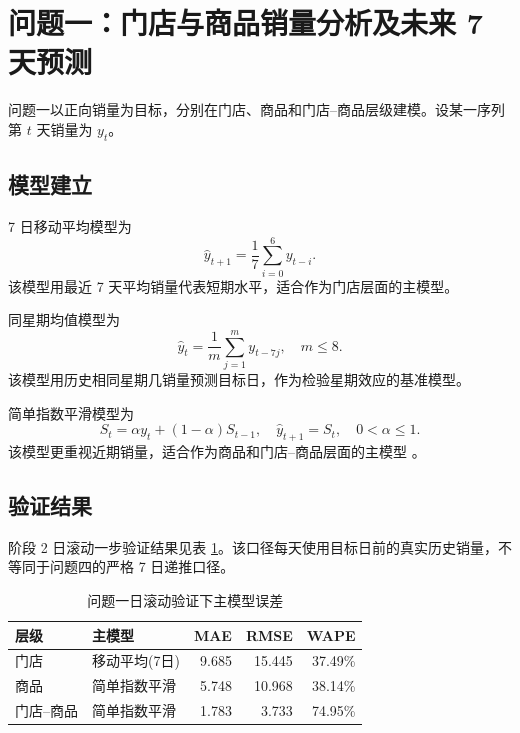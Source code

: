 \section{问题一：门店与商品销量分析及未来 7 天预测}

问题一以正向销量为目标，分别在门店、商品和门店--商品层级建模。设某一序列第 $t$ 天销量为 $y_t$。

\subsection{模型建立}

7 日移动平均模型为
\begin{equation}
\hat y_{t+1}=\frac{1}{7}\sum_{i=0}^{6}y_{t-i}.
\end{equation}
该模型用最近 7 天平均销量代表短期水平，适合作为门店层面的主模型。

同星期均值模型为
\begin{equation}
\hat y_t=\frac{1}{m}\sum_{j=1}^{m}y_{t-7j},\quad m\le 8.
\end{equation}
该模型用历史相同星期几销量预测目标日，作为检验星期效应的基准模型。

简单指数平滑模型为
\begin{equation}
S_t=\alpha y_t+(1-\alpha)S_{t-1},\quad \hat y_{t+1}=S_t,\quad 0<\alpha\le 1.
\end{equation}
该模型更重视近期销量，适合作为商品和门店--商品层面的主模型 \cite{hyndman2021fpp3}。

\subsection{验证结果}

阶段 2 日滚动一步验证结果见表 \ref{tab:q1_metrics}。该口径每天使用目标日前的真实历史销量，不等同于问题四的严格 7 日递推口径。

\begin{table}[H]
\centering
\caption{问题一日滚动验证下主模型误差}
\label{tab:q1_metrics}
\begin{tabular}{llrrr}
\toprule
层级 & 主模型 & MAE & RMSE & WAPE \\
\midrule
门店 & 移动平均(7日) & 9.685 & 15.445 & 37.49\% \\
商品 & 简单指数平滑 & 5.748 & 10.968 & 38.14\% \\
门店--商品 & 简单指数平滑 & 1.783 & 3.733 & 74.95\% \\
\bottomrule
\end{tabular}
\end{table}

